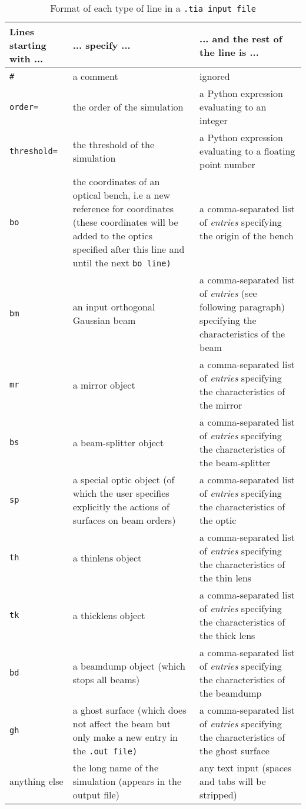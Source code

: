\documentclass{article}
\begin{document}
\begin{table}[h]
\begin{center}
\begin{tabular}{|p{3cm}|p{4cm}|p{8cm}|}
\hline
\textbf{Lines starting with ...} & \textbf{... specify ...} & \textbf{... and the rest of the line is ...} \\ \hline \hline

\tt{\#} & a comment & ignored \\ \hline

\tt{order=} & the order of the simulation & a Python expression evaluating to an integer \\ \hline
\tt{threshold=} & the threshold of the simulation & a Python expression evaluating to a floating point number  \\ \hline
\tt{bo} & the coordinates of an optical bench, i.e a new reference for coordinates (these coordinates will be added to the optics specified after this line and until the next \tt{bo}  line) & a comma-separated list of \textit{entries} specifying the origin of the bench \\ \hline
\tt{bm} & an input orthogonal Gaussian beam & a comma-separated list of \textit{entries}  (see following paragraph) specifying the characteristics of the beam \\ \hline
\tt{mr} & a mirror object & a comma-separated list of \textit{entries} specifying the characteristics of the mirror \\ \hline
\tt{bs} & a beam-splitter object & a comma-separated list of \textit{entries} specifying the characteristics of the beam-splitter \\ \hline
\tt{sp} & a special optic object (of which the user specifies explicitly the actions of surfaces on beam orders) & a comma-separated list of \textit{entries} specifying the characteristics of the optic \\ \hline
\tt{th} & a thinlens object & a comma-separated list of \textit{entries} specifying the characteristics of the thin lens \\ \hline
\tt{tk} & a thicklens object & a comma-separated list of \textit{entries} specifying the characteristics of the thick lens \\ \hline
\tt{bd} & a beamdump object (which stops all beams) & a comma-separated list of \textit{entries} specifying the characteristics of the beamdump \\ \hline
\tt{gh} & a ghost surface (which does not affect the beam but only make a new entry in the \tt{.out} file) & a comma-separated list of \textit{entries} specifying the characteristics of the ghost surface \\ \hline

anything else & the long name of the simulation (appears in the output file) & any text input (spaces and tabs will be stripped) \\ \hline



\end{tabular}
\end{center}
\caption{Format of each type of line in a \tt{.tia} input file}
\label{inputformat}
\end{table}
\end{document}
